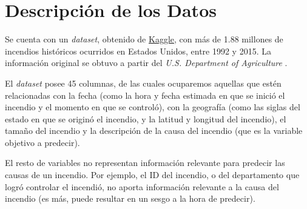 \section{Descripción de los Datos}

Se cuenta con un \textit{dataset}, obtenido de \href{https://www.kaggle.com/rtatman/188-million-us-wildfires}{Kaggle}, con más de 1.88 millones de incendios históricos ocurridos en Estados Unidos, entre 1992 y 2015. La información original se obtuvo a partir del \textit{U.S. Department of Agriculture} \cite{FPA}.

El \textit{dataset} posee 45 columnas, de las cuales ocuparemos aquellas que estén relacionadas con la fecha (como la hora y fecha estimada en que se inició el incendio y el momento en que se controló), con la geografía (como las siglas del estado en que se originó el incendio, y la latitud y longitud del incendio), el tamaño del incendio y la descripción de la causa del incendio (que es la variable objetivo a predecir). 

El resto de variables no representan información relevante para predecir las causas de un incendio. Por ejemplo, el ID del incendio, o del departamento que logró controlar el incendió, no aporta información relevante a la causa del incendio (es más, puede resultar en un sesgo a la hora de predecir).

